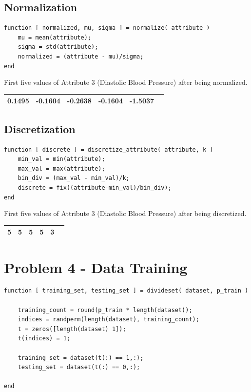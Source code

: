 \documentclass[12pt, letterpaper]{report}
\begin{document}
\subsection{Normalization}

\begin{verbatim}
function [ normalized, mu, sigma ] = normalize( attribute )
    mu = mean(attribute);    
    sigma = std(attribute);
    normalized = (attribute - mu)/sigma;
end
\end{verbatim}

First five values of Attribute 3 (Diastolic Blood Pressure) after being normalized.

\begin{center}
	\begin{tabular}{ |l|l|l|l|l|l| } 
		\hline
		0.1495 & -0.1604 & -0.2638 & -0.1604 & -1.5037 \\
		\hline
	\end{tabular}
\end{center}

\subsection{Discretization}

\begin{verbatim}
function [ discrete ] = discretize_attribute( attribute, k )
    min_val = min(attribute);
    max_val = max(attribute);
    bin_div = (max_val - min_val)/k;
    discrete = fix((attribute-min_val)/bin_div);
end
\end{verbatim}

First five values of Attribute 3 (Diastolic Blood Pressure) after being discretized.

\begin{center}
	\begin{tabular}{ |l|l|l|l|l|l| } 
		\hline
		5 & 5 & 5 & 5 & 3 \\
		\hline
	\end{tabular}
\end{center}

\section{Problem 4 - Data Training}

\begin{verbatim}
function [ training_set, testing_set ] = divideset( dataset, p_train )

    training_count = round(p_train * length(dataset));
    indices = randperm(length(dataset), training_count);
    t = zeros([length(dataset) 1]);
    t(indices) = 1;

    training_set = dataset(t(:) == 1,:);
    testing_set = dataset(t(:) == 0,:);

end
\end{verbatim}
\end{document}
